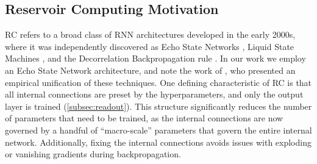 

\subsection{Reservoir Computing Motivation}

RC refers to a broad class of RNN architectures developed in the early
2000s, where it was independently discovered as
Echo State Networks \citep{jaeger_echo_2001},
Liquid State Machines \citep{maass_real-time_2002},
and the Decorrelation Backpropagation rule
\citep{steil_backpropagation-decorrelation_2004}.
In our work we employ an Echo State Network architecture, and note the work of
\citet{verstraeten_experimental_2007}, who presented an empirical unification of
these techniques.
One defining characteristic of RC is that all internal connections are
preset by the hyperparameters, and only the output layer is trained
(\cref{subsec:readout}).
This structure significantly reduces the number of parameters that need to be
trained, as the internal connections are now governed by a handful of
``macro-scale'' parameters that govern the entire internal network.
Additionally, fixing the internal connections avoids issues with exploding
or vanishing gradients during backpropagation.

